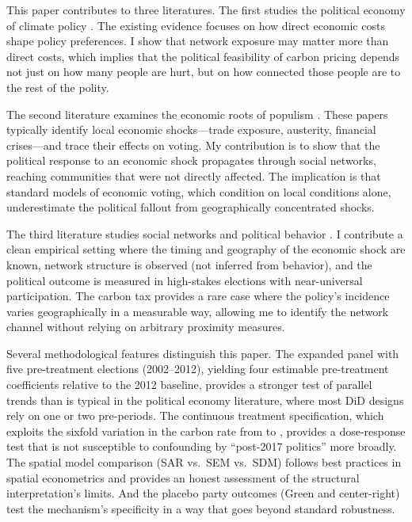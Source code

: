 \documentclass[12pt]{article}
\providecommand{\euro}{\texteuro}
\begin{document}
This paper contributes to three literatures. The first studies the political economy of climate policy \citep{douenne2022yellow, klenert2018carbon, stantcheva2022understanding}. The existing evidence focuses on how direct economic costs shape policy preferences. I show that network exposure may matter more than direct costs, which implies that the political feasibility of carbon pricing depends not just on how many people are hurt, but on how connected those people are to the rest of the polity.

The second literature examines the economic roots of populism \citep{autor2013china, colantone2018trade, fetzer2019did, rodrik2021populism, funke2016going, guiso2019global}. These papers typically identify local economic shocks---trade exposure, austerity, financial crises---and trace their effects on voting. My contribution is to show that the political response to an economic shock propagates through social networks, reaching communities that were not directly affected. The implication is that standard models of economic voting, which condition on local conditions alone, underestimate the political fallout from geographically concentrated shocks.

The third literature studies social networks and political behavior \citep{fluckiger2025bro, enikolopov2020social, halberstam2016homophily, bailey2018social, chetty2022social1}. I contribute a clean empirical setting where the timing and geography of the economic shock are known, network structure is observed (not inferred from behavior), and the political outcome is measured in high-stakes elections with near-universal participation. The carbon tax provides a rare case where the policy's incidence varies geographically in a measurable way, allowing me to identify the network channel without relying on arbitrary proximity measures.

Several methodological features distinguish this paper. The expanded panel with five pre-treatment elections (2002--2012), yielding four estimable pre-treatment coefficients relative to the 2012 baseline, provides a stronger test of parallel trends than is typical in the political economy literature, where most DiD designs rely on one or two pre-periods. The continuous treatment specification, which exploits the sixfold variation in the carbon rate from \euro 7 to \euro 44.60, provides a dose-response test that is not susceptible to confounding by ``post-2017 politics'' more broadly. The spatial model comparison (SAR vs.\ SEM vs.\ SDM) follows best practices in spatial econometrics \citep{lesage2009introduction, anselin1988spatial} and provides an honest assessment of the structural interpretation's limits. And the placebo party outcomes (Green and center-right) test the mechanism's specificity in a way that goes beyond standard robustness.
\end{document}
